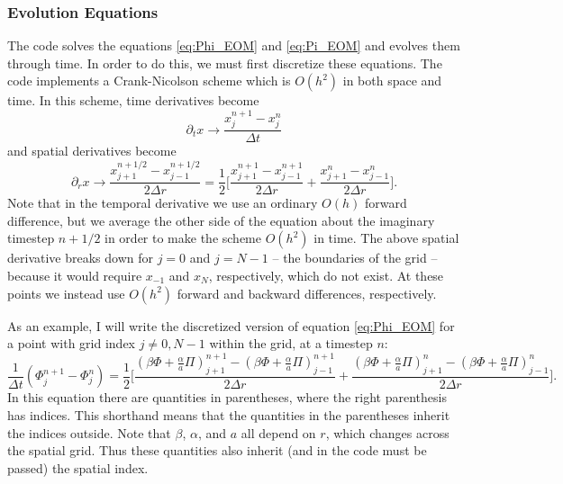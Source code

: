 \documentclass[12pt]{article}
\numberwithin{equation}{section}
\begin{document}
\subsubsection{Evolution Equations}
The code solves the equations \ref{eq:Phi_EOM} and \ref{eq:Pi_EOM} and evolves them through time.  In order to do this, we must first discretize these equations.  The code implements a Crank-Nicolson scheme which is $O(h^2)$ in both space and time.  In this scheme, time derivatives become
\begin{equation}
\partial_t x \to \frac{x^{n+1}_j - x^{n}_j}{\Delta t}
\end{equation}
and spatial derivatives become
\begin{equation}
\partial_r x \to \frac{x^{n+1/2}_{j+1} - x^{n+1/2}_{j-1}}{2 \Delta r} = \frac{1}{2} \Big[ \frac{x^{n+1}_{j+1} - x^{n+1}_{j-1}}{2 \Delta r} + \frac{x^{n}_{j+1} - x^{n}_{j-1}}{2 \Delta r} \Big].
\end{equation}
Note that in the temporal derivative we use an ordinary $O(h)$ forward difference, but we average the other side of the equation about the imaginary timestep $n+1/2$ in order to make the scheme $O(h^2)$ in time.  The above spatial derivative breaks down for $j = 0$ and $j = N-1$ -- the boundaries of the grid -- because it would require $x_{-1}$ and $x_{N}$, respectively, which do not exist.  At these points we instead use $O(h^2)$ forward and backward differences, respectively.

As an example, I will write the discretized version of equation \ref{eq:Phi_EOM} for a point with grid index $j \neq 0, N-1$ within the grid, at a timestep $n$:
\begin{equation}
\frac{1}{\Delta t} (\Phi^{n+1}_j - \Phi^{n}_j) = \frac{1}{2} \Big[ \frac{(\beta \Phi + \frac{\alpha}{a} \Pi)^{n+1}_{j+1} - (\beta \Phi + \frac{\alpha}{a} \Pi)^{n+1}_{j-1}}{2 \Delta r} + \frac{(\beta \Phi + \frac{\alpha}{a} \Pi)^{n}_{j+1} - (\beta \Phi + \frac{\alpha}{a} \Pi)^{n}_{j-1}}{2 \Delta r} \Big].
\end{equation}
In this equation there are quantities in parentheses, where the right parenthesis has indices.  This shorthand means that the quantities in the parentheses inherit the indices outside.  Note that $\beta$, $\alpha$, and $a$ all depend on $r$, which changes across the spatial grid.  Thus these quantities also inherit (and in the code must be passed) the spatial index.
\end{document}
